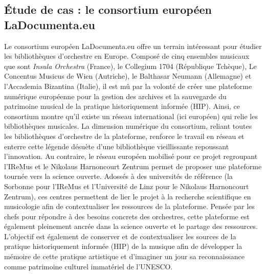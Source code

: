 \subsection*{Étude de cas : le consortium européen LaDocumenta.eu}
\label{subsec:ladocumenta_cas} %
Le consortium européen LaDocumenta.eu offre un terrain intéressant pour étudier les bibliothèques d'orchestre en Europe. Composé de cinq ensembles musicaux que sont \textit{Insula Orchestra} (France), le Collegium 1704 (République Tchèque), Le Concentus Musicus de Wien (Autriche), le Balthasar Neumann (Allemagne) et l'Accademia Bizantina (Italie), il est mû par la volonté de créer une plateforme numérique européenne pour la gestion des archives et la sauvegarde du patrimoine musical de la pratique historiquement informée (HIP). 
Ainsi, ce consortium montre qu'il existe un réseau international (ici européen) qui relie les bibliothèques musicales. La dimension numérique du consortium, reliant toutes les bibliothèques d'orchestre de la plateforme, renforce le travail en réseau et enterre cette légende désuète d'une bibliothèque vieillissante repoussant l'innovation. Au contraire, le réseau européen mobilisé pour ce projet regroupant l'IReMus et le Nikolaus Harnoncourt Zentrum permet de proposer une plateforme tournée vers la science ouverte. Adossés à des universités de référence (la Sorbonne pour l'IReMus et l'Université de Linz pour le Nikolaus Harnoncourt Zentrum), ces centres permettent de lier le projet à la recherche scientifique en musicologie afin de contextualiser les ressources de la plateforme. 
Pensée par les chefs pour répondre à des besoins concrets des orchestres, cette plateforme est également pleinement ancrée dans la science ouverte et le partage des ressources. L'objectif est également de conserver et de contextualiser les sources de la pratique historiquement informée (HIP) de la musique afin de développer la mémoire de cette pratique artistique et d'imaginer un jour sa reconnaissance comme patrimoine culturel immatériel de l'UNESCO.

